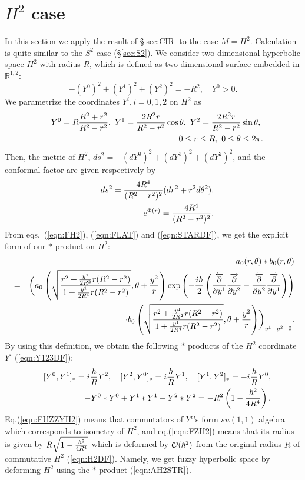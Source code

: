 \documentclass[12pt,a4paper]{article}
\def\h{\hbar}
\begin{document}
\section{$H^2$ case\label{sec:H2}}

In this section we apply the result of \S\ref{sec:CIR}
to the case $M=H^2$.
Calculation is quite similar to the $S^2$ case (\S\ref{sec:S2}).
We consider two dimensional hyperbolic space $H^2$ with radius $R$,
which is defined as two dimensional surface embedded in ${\mathbb
  R}^{1,2}$:
\begin{equation}
\label{eqn:H2DF}
-(Y^0)^2+(Y^1)^2+(Y^2)^2=-R^2,\quad Y^0>0.
\end{equation}
We parametrize the coordinates $Y^i,i=0,1,2$ on $H^2$ as
\begin{eqnarray}
\label{eqn:Y123DF}
&&Y^0=R{R^2+r^2\over R^2-r^2},\ Y^1={2R^2r\over R^2-r^2}\cos\theta,\ Y^2={2R^2r\over R^2-r^2}\sin\theta,\ \nonumber\\
&&0\leq r\leq R,\ 0\leq\theta\leq2\pi.
\end{eqnarray}
Then, the metric of $H^2$, $ds^2=-(dY^0)^2+(dY^1)^2+(dY^2)^2$, and the
conformal factor are given respectively by
\begin{eqnarray}
\label{eqn:H2DS2}
&&ds^2={4R^4\over(R^2-r^2)^2}(dr^2+r^2d\theta^2),\\
\label{eqn:FH2}
&&e^{\Phi(r)}={4R^4\over(R^2-r^2)^2}.
\end{eqnarray}
From eqs.\ (\ref{eqn:FH2}), (\ref{eqn:FLAT}) and (\ref{eqn:STARDF}),
we get the explicit form of our $*$ product on $H^2$:
\begin{eqnarray}
\label{eqn:AH2STR}
&&a_0(r,\theta)*b_0(r,\theta)\nonumber\\
&=&\biggl(a_0\left(\sqrt{r^2+{y^1\over2R^2}r(R^2-r^2)\over1+{y^1\over2R^4}r(R^2-r^2)},\theta+{y^2\over
    r}\right)\exp\left(-{i\h\over2}\left({{\overleftarrow
        \partial}\over\partial y^1}{{\overrightarrow
        \partial}\over\partial y^2}-{{\overleftarrow
        \partial}\over\partial y^2}{{\overrightarrow
        \partial}\over\partial y^1}\right)\right)\nonumber\\
&&\cdot
b_0\left(\sqrt{r^2+{y^1\over2R^2}r(R^2-r^2)\over1+{y^1\over2R^4}r(R^2-r^2)},\theta+{y^2\over
    r}\right)\biggr)_{y^1=y^2=0}.
\end{eqnarray}
By using this definition, we obtain the following  $*$ products of the $H^2$
coordinate $Y^i$ (\ref{eqn:Y123DF}):
\begin{eqnarray}
\label{eqn:FUZZYH2}
&&[Y^0,Y^1]_*=i{\h\over R}Y^2,\quad [Y^2,Y^0]_*=i{\h\over R}Y^1,\quad
[Y^1,Y^2]_*=-i{\h\over R}Y^0,\\
\label{eqn:FZH2}
&&-Y^0*Y^0+Y^1*Y^1+Y^2*Y^2=-R^2\left(1-{\h^2\over4R^4}\right).
\end{eqnarray}
Eq.(\ref{eqn:FUZZYH2}) means that commutators of $Y^i$'s form $su(1,1)$
algebra which corresponds to isometry of $H^2$, and eq.(\ref{eqn:FZH2})
means that its radius is given by $R\sqrt{1-{\h^2\over4R^4}}$ which is
deformed by ${\cal O}(\h^2)$ from the original radius $R$ of commutative
$H^2$ (\ref{eqn:H2DF}).
Namely, we get fuzzy hyperbolic space by deforming  $H^2$ using the $*$
product (\ref{eqn:AH2STR}).
\end{document}
